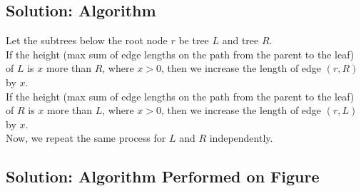 \documentclass[letter,11pt]{article}
\begin{document}
\subsection{Solution: Algorithm}

Let the subtrees below the root node $r$ be tree $L$ and tree $R$. \\

If the height (max sum of edge lengths on the path from the parent to the leaf) of $L$ is $x$ more than $R$, where $x > 0$, then we increase the length of edge $(r, R)$ by $x$. \\

If the height (max sum of edge lengths on the path from the parent to the leaf) of $R$ is $x$ more than $L$, where $x > 0$, then we increase the length of edge $(r, L)$ by $x$. \\

Now, we repeat the same process for $L$ and $R$ independently.



\subsection{Solution: Algorithm Performed on Figure}
\end{document}
